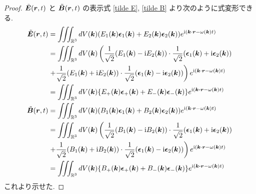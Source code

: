 \documentclass[uplatex,a4paper,dvipdfmx]{jsarticle}
\theoremstyle{definition}
\begin{document}
\begin{proof}
  $\tilde{\vb*{E}}(\vb*{r}, t)$ と $\tilde{\vb*{B}}(\vb*{r}, t)$ の表示式 \eqref{tilde E}, \eqref{tilde B} より次のように式変形できる.
  \begin{align}
    \tilde{\EE}(\rr, t) & = \iiint_{\RR^3} dV(\kk)\qty(E_1(\kk)\ee_1(\kk) + E_2(\kk)\ee_2(\kk))e^{\ii(\kk\cdot\rr - \omega(\kk)t)}                                                  \\
                        & = \iiint_{\RR^3} dV(\kk)\left(\frac{1}{\sqrt{2}}\qty(E_1(\kk) - \ii E_2(\kk))\cdot\frac{1}{\sqrt{2}}\qty(\ee_1(\kk) + \ii\ee_2(\kk)) \right.              \\
                        & \left. + \frac{1}{\sqrt{2}}\qty(E_1(\kk) + \ii E_2(\kk))\cdot\frac{1}{\sqrt{2}}\qty(\ee_1(\kk) - \ii\ee_2(\kk))\right)e^{\ii(\kk\cdot\rr - \omega(\kk)t)} \\
                        & = \iiint_{\RR^3} dV(\kk)\qty{E_+(\kk)\ee_+(\kk) + E_-(\kk)\ee_-(\kk)}e^{\ii(\kk\vdot\rr - \omega(\kk)t)}                                                  \\
    \tilde{\BB}(\rr, t) & = \iiint_{\RR^3} dV(\kk)(B_1(\kk)\ee_1(\kk) + B_2(\kk)\ee_2(\kk))e^{\ii(\kk\cdot\rr - \omega(\kk)t)}                                                      \\
                        & = \iiint_{\RR^3} dV(\kk)\left(\frac{1}{\sqrt{2}}\qty(B_1(\kk) - \ii B_2(\kk))\cdot\frac{1}{\sqrt{2}}\qty(\ee_1(\kk) + \ii\ee_2(\kk)) \right.              \\
                        & \left. + \frac{1}{\sqrt{2}}\qty(B_1(\kk) + \ii B_2(\kk))\cdot\frac{1}{\sqrt{2}}\qty(\ee_1(\kk) - \ii\ee_2(\kk))\right)e^{\ii(\kk\cdot\rr - \omega(\kk)t)} \\
                        & = \iiint_{\RR^3} dV(\kk)\qty{B_+(\kk)\ee_+(\kk) + B_-(\kk)\ee_-(\kk)}e^{\ii(\kk\vdot\rr - \omega(\kk)t)}
  \end{align}
  これより示せた.
\end{proof}
\end{document}

